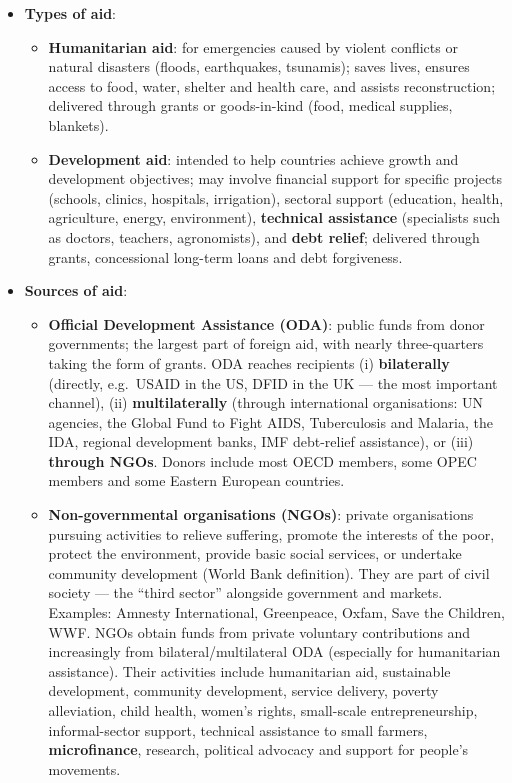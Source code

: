 \documentclass[a4paper,12pt]{article}
\begin{document}
\begin{itemize}
  \item \textbf{Types of aid}:
  \begin{itemize}
    \item \textbf{Humanitarian aid}: for emergencies caused by violent conflicts or natural disasters (floods, earthquakes, tsunamis); saves lives, ensures access to food, water, shelter and health care, and assists reconstruction; delivered through grants or goods-in-kind (food, medical supplies, blankets).
    \item \textbf{Development aid}: intended to help countries achieve growth and development objectives; may involve financial support for specific projects (schools, clinics, hospitals, irrigation), sectoral support (education, health, agriculture, energy, environment), \textbf{technical assistance} (specialists such as doctors, teachers, agronomists), and \textbf{debt relief}; delivered through grants, concessional long-term loans and debt forgiveness.
  \end{itemize}
  \item \textbf{Sources of aid}:
  \begin{itemize}
    \item \textbf{Official Development Assistance (ODA)}: public funds from donor governments; the largest part of foreign aid, with nearly three-quarters taking the form of grants. ODA reaches recipients (i) \textbf{bilaterally} (directly, e.g.\ USAID in the US, DFID in the UK --- the most important channel), (ii) \textbf{multilaterally} (through international organisations: UN agencies, the Global Fund to Fight AIDS, Tuberculosis and Malaria, the IDA, regional development banks, IMF debt-relief assistance), or (iii) \textbf{through NGOs}. Donors include most OECD members, some OPEC members and some Eastern European countries.
    \item \textbf{Non-governmental organisations (NGOs)}: private organisations pursuing activities to relieve suffering, promote the interests of the poor, protect the environment, provide basic social services, or undertake community development (World Bank definition). They are part of civil society --- the ``third sector'' alongside government and markets. Examples: Amnesty International, Greenpeace, Oxfam, Save the Children, WWF. NGOs obtain funds from private voluntary contributions and increasingly from bilateral/multilateral ODA (especially for humanitarian assistance). Their activities include humanitarian aid, sustainable development, community development, service delivery, poverty alleviation, child health, women's rights, small-scale entrepreneurship, informal-sector support, technical assistance to small farmers, \textbf{microfinance}, research, political advocacy and support for people's movements.

\end{itemize}
\end{itemize}
\end{document}
